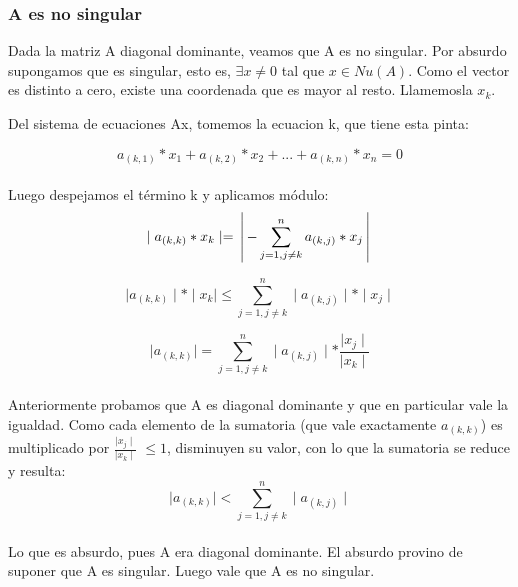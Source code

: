 \subsubsection{A es no singular}
Dada la matriz A diagonal dominante, veamos que A es no singular.
Por absurdo supongamos que es singular, esto es, $\exists x\neq 0$ tal que $x \in Nu(A)$.
Como el vector es distinto a cero, existe una coordenada que es mayor al resto. Llamemosla $x_{k}$.


Del sistema de ecuaciones Ax, tomemos la ecuacion k, que tiene esta pinta:                  

$$ a_{(k, 1)} * x_{1} + a_{(k, 2)} * x_{2} +... + a_{(k, n)} * x_{n} = 0 $$\\

Luego despejamos el término k y aplicamos módulo:\\

 $$ \mid a_{(k, k)} * x_{k} \mid  =  \left \arrowvert - \sum_{j=1,j\neq k}^{n}  a_{(k,j)} * x_{j} \right \arrowvert $$

 $$ \mid a_{(k, k)}\mid * \mid x_{k} \mid \leq \sum_{j=1,j\neq k}^{n} \mid a_{(k,j)}\mid * \mid x_{j} \mid $$


 $$ \mid a_{(k, k)}\mid  = \sum_{j=1,j\neq k}^{n} \mid a_{(k,j)}\mid *  \frac{\mid x_{j} \mid}{\mid x_{k} \mid}$$\\

Anteriormente probamos que A es diagonal dominante y que en particular vale la igualdad. Como cada elemento de la sumatoria (que vale exactamente $a_{(k, k)}$) es multiplicado por $\frac{\mid x_{j} \mid}{\mid x_{k} \mid}$ $\leq 1$, disminuyen su valor, con lo que la sumatoria se reduce y resulta:\\

$$\mid a_{(k,k)} \mid < \sum_{j=1, j\neq k}^{n}\mid a_{(k,j)} \mid $$\\

Lo que es absurdo, pues A era diagonal dominante. El absurdo provino de suponer que A es singular. Luego vale que A es no singular.